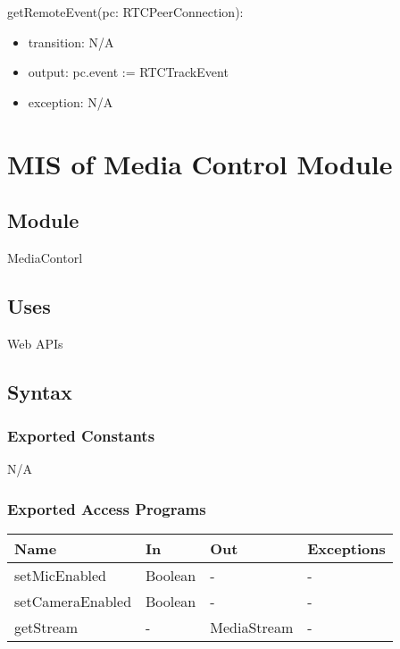 \documentclass[12pt, titlepage]{article}
\begin{document}
\noindent getRemoteEvent(pc: RTCPeerConnection):
\begin{itemize}
\item transition: N/A
\item output: pc.event := RTCTrackEvent
\item exception: N/A
\end{itemize}

\section{MIS of Media Control Module} \label{sec:mediactrl}

\subsection{Module}

MediaContorl

\subsection{Uses}

\noindent Web APIs

\subsection{Syntax}

\subsubsection{Exported Constants}

N/A

\subsubsection{Exported Access Programs}

\begin{center}
  \begin{tabular}{p{4cm} p{4cm} p{4cm} p{2cm}}
    \hline
    \textbf{Name}          & \textbf{In}   & \textbf{Out}      & \textbf{Exceptions} \\
    \hline
    setMicEnabled    & Boolean & -           & -             \\
    setCameraEnabled & Boolean & -           & -             \\
    getStream        & -       & MediaStream & -             \\
    \hline
  \end{tabular}
\end{center}
\end{document}
